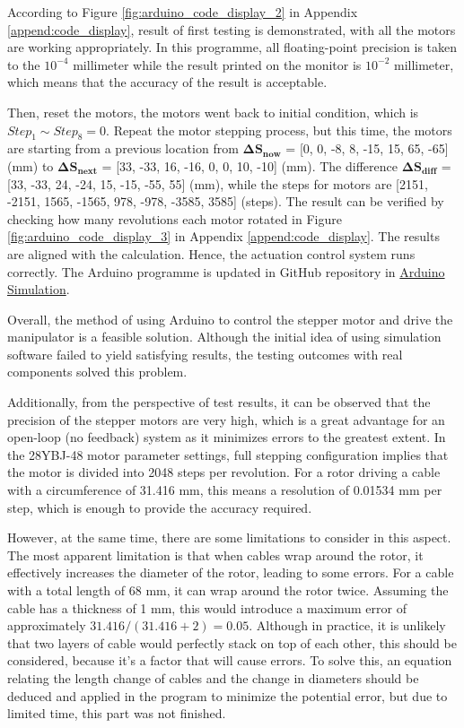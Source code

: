 According to Figure \ref{fig:arduino_code_display_2} in Appendix \ref{append:code_display}, result of first testing 
is demonstrated, with all the motors are working appropriately. In this programme, all floating-point precision 
is taken to the $10^{-4}$ millimeter while the result printed on the monitor is $10^{-2}$ millimeter, 
which means that the accuracy of the result is acceptable.

Then, reset the motors, the motors went back to initial condition, which is $Step_1 \sim Step_8=0$. Repeat the 
motor stepping process, but this time, the motors are starting from a previous location from
$\boldsymbol{\Delta S_{now}}$ = [0, 0, -8, 8, -15, 15, 65, -65] (mm) to $\boldsymbol{\Delta S_{next}}$ = 
[33, -33, 16, -16, 0, 0, 10, -10] (mm). The difference $\boldsymbol{\Delta S_{diff}}$ = 
[33, -33, 24, -24, 15, -15, -55, 55] (mm), while the steps for motors are 
[2151, -2151, 1565, -1565, 978, -978, -3585, 3585] (steps). The result can be verified by checking how many 
revolutions each motor rotated in Figure \ref{fig:arduino_code_display_3} in Appendix \ref{append:code_display}.
The results are aligned with the calculation. Hence, the actuation control system runs correctly.
The Arduino programme is updated in GitHub repository in 
\href{https://github.com/yezehao/Compact-Continuum-Manipulator-Platform/tree/main/Arduino-Simulation}
{Arduino Simulation}.

Overall, the method of using Arduino to control the stepper motor and drive the manipulator is a feasible solution. 
Although the initial idea of using simulation software failed to yield satisfying results, the testing outcomes with 
real components solved this problem.

Additionally, from the perspective of test results, it can be observed that the precision of the stepper motors are 
very high, which is a great advantage for an open-loop (no feedback) system as it minimizes errors to the greatest 
extent. In the 28YBJ-48 motor parameter settings, full stepping configuration implies that the motor is divided into 
2048 steps per revolution. For a rotor driving a cable with a circumference of 31.416 mm, this means a resolution of 
0.01534 mm per step, which is enough to provide the accuracy required.

However, at the same time, there are some limitations to consider in this aspect. The most apparent limitation is that 
when cables wrap around the rotor, it effectively increases the diameter of the rotor, leading to some errors. For a 
cable with a total length of 68 mm, it can wrap around the rotor twice. Assuming the cable has a thickness of 1 mm, this 
would introduce a maximum error of approximately $ 31.416 / (31.416 + 2) = 0.05 $. Although in practice, it is unlikely 
that two layers of cable would perfectly stack on top of each other, this should be considered, because it's a factor 
that will cause errors. To solve this, an equation relating the length change of cables and the change in diameters 
should be deduced and applied in the program to minimize the potential error, but due to limited time, this part was 
not finished.

